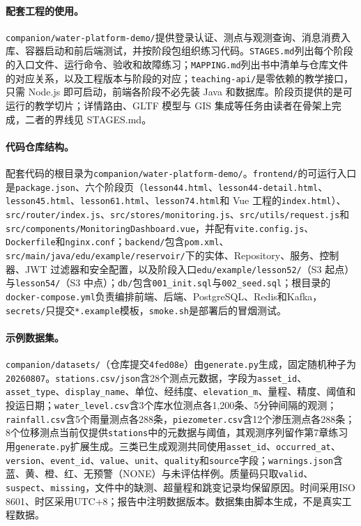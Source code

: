 \paragraph{配套工程的使用。}\texttt{companion/water-platform-demo/}提供登录认证、测点与观测查询、消息消费入库、容器启动和前后端测试，并按阶段包组织练习代码。\texttt{STAGES.md}列出每个阶段的入口文件、运行命令、验收和故障练习；\texttt{MAPPING.md}列出书中清单与仓库文件的对应关系，以及工程版本与阶段的对应；\texttt{teaching-api/}是零依赖的教学接口，只需 Node.js 即可启动，前端各阶段不必先装 Java 和数据库。阶段页提供的是可运行的教学切片；详情路由、GLTF 模型与 GIS 集成等任务由读者在骨架上完成，二者的界线见 STAGES.md。

\paragraph{代码仓库结构。}配套代码的根目录为\texttt{companion/}\allowbreak\texttt{water-platform-}\allowbreak\texttt{demo/}。\texttt{frontend/}的可运行入口是\texttt{package.json}、六个阶段页（\texttt{lesson44.html}、\texttt{lesson44-}\allowbreak\texttt{detail.html}、\texttt{lesson45.html}、\texttt{lesson61.html}、\texttt{lesson74.html}和 Vue 工程的\texttt{index.html}）、\texttt{src/router/}\allowbreak\texttt{index.js}、\texttt{src/stores/}\allowbreak\texttt{monitoring.js}、\texttt{src/utils/}\allowbreak\texttt{request.js}和\texttt{src/components/}\allowbreak\texttt{Monitoring}\allowbreak\texttt{Dashboard.vue}，并配有\texttt{vite.config.js}、\texttt{Dockerfile}和\texttt{nginx.conf}；\texttt{backend/}包含\texttt{pom.xml}、\texttt{src/main/java/}\allowbreak\texttt{edu/example/}\allowbreak\texttt{reservoir/}下的实体、Repository、服务、控制器、JWT 过滤器和安全配置，以及阶段入口\texttt{edu/example/}\allowbreak\texttt{lesson52/}（S3 起点）与\texttt{lesson54/}（S3 中点）；\texttt{db/}包含\texttt{001\_init.sql}与\texttt{002\_seed.sql}；根目录的\texttt{docker-compose.yml}负责编排前端、后端、PostgreSQL、Redis和Kafka，\texttt{secrets/}只提交\texttt{*.example}模板，\texttt{smoke.sh}是部署后的冒烟测试。

\paragraph{示例数据集。}\texttt{companion/datasets/}（仓库提交\texttt{4fed08e}）由\texttt{generate.py}生成，固定随机种子为\texttt{20260807}。\texttt{stations.csv/json}含28个测点元数据，字段为\texttt{asset\_id}、\texttt{asset\_type}、\texttt{display\_name}、单位、经纬度、\texttt{elevation\_m}、量程、精度、阈值和投运日期；\texttt{water\_level.csv}含3个库水位测点各1,200条、5分钟间隔的观测；\texttt{rainfall.csv}含5个雨量测点各288条，\texttt{piezometer.csv}含12个渗压测点各288条；8个位移测点当前仅提供\texttt{stations}中的元数据与阈值，其观测序列留作第7章练习用\texttt{generate.py}扩展生成。三类已生成观测共同使用\texttt{asset\_id}、\texttt{occurred\_at}、\texttt{version}、\texttt{event\_id}、\texttt{value}、\texttt{unit}、\texttt{quality}和\texttt{source}字段；\texttt{warnings.json}含蓝、黄、橙、红、无预警（NONE）与未评估样例。质量码只取\texttt{valid}、\texttt{suspect}、\texttt{missing}，文件中的缺测、超量程和跳变记录均保留原因。时间采用ISO 8601、时区采用UTC+8；报告中注明数据版本。数据集由脚本生成，不是真实工程数据。

